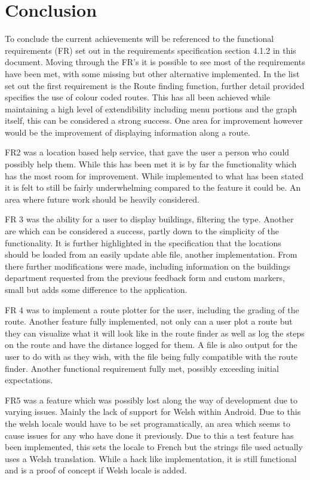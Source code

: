 \section{Conclusion}
To conclude the current achievements will be referenced to the functional requirements (FR) set out in the requirements specification section 4.1.2 in this document. Moving through the FR's it is possible to see most of the requirements have been met, with some missing but other alternative implemented. In the list set out the first requirement is the Route finding function, further detail provided specifies the use of colour coded routes. This has all been achieved while maintaining a high level of extendibility including menu portions and the graph itself, this can be considered a strong success. One area for improvement however would be the improvement of displaying information along a route. 

FR2 was a location based help service, that gave the user a person who could possibly help them. While this has been met it is by far the functionality which has the most room for improvement. While implemented to what has been stated it is felt to still be fairly underwhelming compared to the feature it could be. An area where future work should be heavily considered.

FR 3 was the ability for a user to display buildings, filtering the type. Another are which can be considered a success, partly down to the simplicity of the functionality. It is further highlighted in the specification that the locations should be loaded from an easily update able file, another implementation. From there further modifications were made, including information on the buildings department requested from the previous feedback form and custom markers, small but adds some difference to the application. 

FR 4 was to implement a route plotter for the user, including the grading of the route. Another feature fully implemented, not only can a user plot a route but they can visualize what it will look like in the route finder as well as log the steps on the route and have the distance logged for them. A file is also output for the user to do with as they wish, with the file being fully compatible with the route finder. Another functional requirement fully met, possibly exceeding initial expectations.

FR5 was a feature which was possibly lost along the way of development due to varying issues. Mainly the lack of support for Welsh within Android. Due to this the welsh locale would have to be set programatically, an area which seems to cause issues for any who have done it previously. Due to this a test feature has been implemented, this sets the locale to French but the strings file used actually uses a Welsh translation. While a hack like implementation, it is still functional and is a proof of concept if Welsh locale is added.

